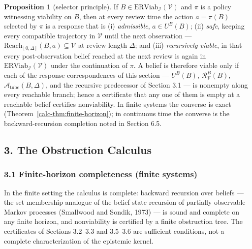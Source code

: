 \documentclass[10pt,twocolumn]{article}
\theoremstyle{definition}
\newtheorem{proposition}{Proposition}
\begin{document}
\begin{proposition}[selector principle]\label{calc-prop:selector}
If \(B\in\mathrm{ERViab}_{\mathcal{I}}(\mathcal{V})\) and \(\pi\) is a
policy witnessing viability on \(B\), then at every review time the
action \(a=\pi(B)\) selected by \(\pi\) is a response that is
(i) \emph{admissible}, \(a\in U^B(B)\); (ii) \emph{safe}, keeping every
compatible trajectory in \(\mathcal{V}\) until the next observation ---
\(\mathrm{Reach}_{[0,\Delta]}(B,a)\subseteq\mathcal{V}\) at review
length \(\Delta\); and (iii) \emph{recursively viable}, in that every
post-observation belief reached at the next review is again in
\(\mathrm{ERViab}_{\mathcal{I}}(\mathcal{V})\) under the continuation
of \(\pi\). A belief is therefore viable only if each of the response
correspondences of this section --- \(U^B(B)\),
\(\mathcal{R}_{\mathcal{V}}^B(B)\), \(\mathcal{A}_{\mathrm{tube}}(B,\Delta)\),
and the recursive predecessor of Section 3.1 --- is nonempty along
every reachable branch; hence a certificate that any one of them is
empty at a reachable belief certifies nonviability. In finite systems
the converse is exact (Theorem~\ref{calc-thm:finite-horizon}); in continuous
time the converse is the backward-recursion completion noted in
Section 6.5.
\end{proposition}



\subsection{3. The Obstruction Calculus}\label{calc-the-obstruction-calculus}

\subsubsection{3.1 Finite-horizon completeness (finite systems)}\label{calc-finite-horizon-completeness}

In the finite setting the calculus is complete: backward recursion over beliefs --- the set-membership analogue of the belief-state recursion of partially observable Markov processes (Smallwood and Sondik, 1973) --- is sound and complete on any finite horizon, and nonviability is certified by a finite obstruction tree. The certificates of Sections 3.2--3.3 and 3.5--3.6 are sufficient conditions, not a complete characterization of the epistemic kernel.
\end{document}
